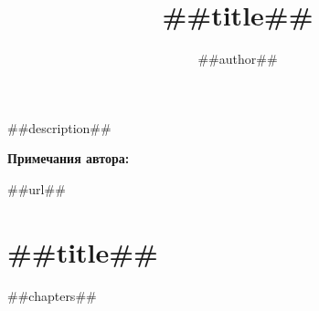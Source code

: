 \documentclass[twoside,a5paper,12pt]{extbook}
\title{##title##}
\author{##author##}
\date{}
\begin{document}
\maketitle


##description##

\vfill

\textbf{Примечания автора:}


\begin{flushright}
##url##
\end{flushright}


\tableofcontents


\chapter{##title##}
\thispagestyle{empty}


##chapters##
\end{document}
